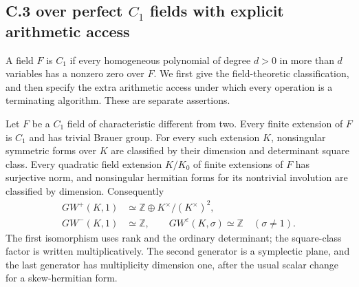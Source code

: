 \subsection{C.3 over perfect \texorpdfstring{$C_1$}{C1} fields with explicit arithmetic access}

A field $F$ is $C_1$ if every homogeneous polynomial of degree $d>0$
in more than $d$ variables has a nonzero zero over $F$.
We first give the field-theoretic classification, and then specify the
extra arithmetic access under which every operation is a terminating
algorithm. These are separate assertions.

\begin{lemma}
\label{C:C1_field_forms}
Let $F$ be a $C_1$ field of characteristic different from two.
Every finite extension of $F$ is $C_1$ and has trivial Brauer group.
For every such extension $K$, nonsingular symmetric forms over $K$
are classified by their dimension and determinant square class.
Every quadratic field extension $K/K_0$ of finite extensions of $F$
has surjective norm, and nonsingular hermitian forms for its nontrivial
involution are classified by dimension. Consequently
\[
 \begin{split}
 GW^+(K,1)&\simeq\mathbb Z\oplus K^\times/(K^\times)^2,\\
 GW^-(K,1)&\simeq\mathbb Z,\qquad
 GW^\varepsilon(K,\sigma)\simeq\mathbb Z\quad(\sigma\ne1).
 \end{split}                                               \tag{C.3.Q1}
\]
The first isomorphism uses rank and the ordinary determinant; the
square-class factor is written multiplicatively. The second generator
is a symplectic plane, and the last generator has multiplicity dimension
one, after the usual scalar change for a skew-hermitian form.
\end{lemma}
